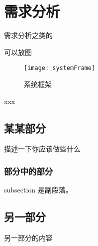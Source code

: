 \chapter{需求分析}
\label{cha:demandAnalysis}

需求分析之类的

可以放图

\begin{figure}[H]
  \centering
  \texttt{[image: systemFrame]}
  \caption{系统框架}
  \label{fig:systemFrame}
\end{figure}

xxx

\section{某某部分}
\label{sec:mainGame}

描述一下你应该做些什么

\subsection{部分中的部分}

subsection 是副段落。

\section{另一部分}
\label{section2}

另一部分的内容